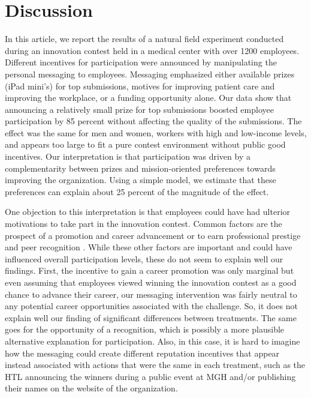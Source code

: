 \documentclass[11pt, titlepage]{article}
\begin{document}
\section{Discussion}\label{discussion}

In this article, we report the results of a natural field experiment
conducted during an innovation contest held in a medical center with
over 1200 employees. Different incentives for participation were
announced by manipulating the personal messaging to employees. Messaging
emphasized either available prizes (iPad mini's) for top submissions,
motives for improving patient care and improving the workplace, or a
funding opportunity alone. Our data show that announcing a relatively
small prize for top submissions boosted employee participation by 85
percent without affecting the quality of the submissions. The effect was
the same for men and women, workers with high and low-income levels, and
appears too large to fit a pure contest environment without public good
incentives. Our interpretation is that participation was driven by a
complementarity between prizes and mission-oriented preferences towards
improving the organization. Using a simple model, we estimate that these
preferences can explain about 25 percent of the magnitude of the effect.

One objection to this interpretation is that employees could have had
ulterior motivations to take part in the innovation contest. Common
factors are the prospect of a promotion and career advancement
\citep{baker1994internal, gibbs1995incentive} or to earn professional
prestige and peer recognition
\citep{kosfeld2011getting, blanes2011tournaments}. While these other
factors are important and could have influenced overall participation
levels, these do not seem to explain well our findings. First, the
incentive to gain a career promotion was only marginal but even assuming
that employees viewed winning the innovation contest as a good chance to
advance their career, our messaging intervention was fairly neutral to
any potential career opportunities associated with the challenge. So, it
does not explain well our finding of significant differences between
treatments. The same goes for the opportunity of a recognition, which is
possibly a more plausible alternative explanation for participation.
Also, in this case, it is hard to imagine how the messaging could create
different reputation incentives that appear instead associated with
actions that were the same in each treatment, such as the HTL announcing
the winners during a public event at MGH and/or publishing their names
on the website of the organization.
\end{document}
